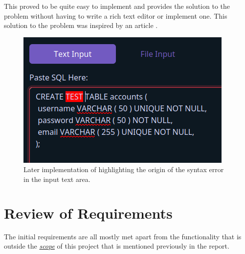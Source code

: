This proved to be quite easy to implement and provides the solution to the problem without having to write a rich text editor or implement one. This solution to the problem was inspired by an article \cite{fakeTextArea}.

\begin{figure}[h!]
	\centering
	\includegraphics[scale = 1]{highlightedTextArea}
	\caption{Later implementation of highlighting the origin of the syntax error in the input text area.}
	\label{fig:highlightedTextArea}
\end{figure}

\newpage

\section{Review of Requirements}

The initial requirements are all mostly met apart from the functionality that is outside the \textit{\hyperref[subsec:scope]{scope}} of this project that is mentioned previously in the report. 

